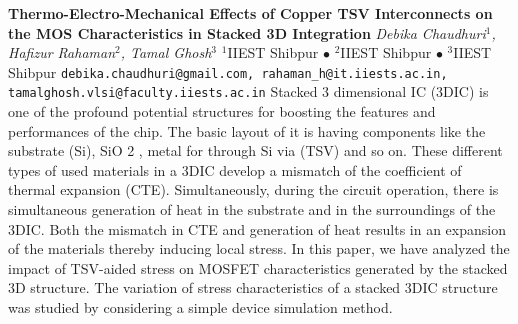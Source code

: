 
    \begin{conf-abstract}[]
        {\textbf{Thermo-Electro-Mechanical Effects of Copper TSV Interconnects on the MOS Characteristics in Stacked 3D  Integration}}
        {\textit{Debika Chaudhuri$^{1}$, Hafizur Rahaman$^{2}$, Tamal Ghosh$^{3}$}}
        {$^{1}$IIEST Shibpur $\bullet$ $^{2}$IIEST Shibpur $\bullet$ $^{3}$IIEST Shibpur}
        {\texttt{debika.chaudhuri@gmail.com, rahaman_h@it.iiests.ac.in, tamalghosh.vlsi@faculty.iiests.ac.in}}
        {Stacked 3 dimensional IC (3DIC) is one of the profound potential structures for boosting the features and performances of the chip. The basic layout of it is having components like the substrate (Si), SiO 2 , metal for through Si via (TSV) and so on. These different types of used materials in a 3DIC develop a mismatch of the coefficient of thermal expansion (CTE). Simultaneously, during the circuit operation, there is simultaneous generation of heat in the substrate and in the surroundings of the 3DIC. Both the mismatch in CTE and generation of heat results in an expansion of the materials thereby inducing local stress. In this paper, we have analyzed the impact of TSV-aided stress on MOSFET characteristics generated by the stacked 3D structure. The variation of stress characteristics of a stacked 3DIC structure was studied by considering a simple device simulation method.}
    \end{conf-abstract}
        